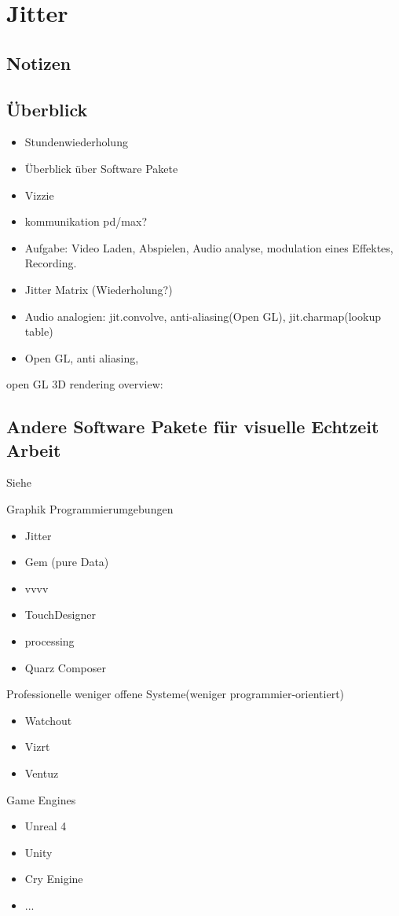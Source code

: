\chapter{Jitter}
\label{Jitter}
\section{Notizen}

\section{Überblick}
\begin{itemize}
	\item Stundenwiederholung
	\item Überblick über Software Pakete
	\item Vizzie
	\item kommunikation pd/max?
	\item Aufgabe: Video Laden, Abspielen, Audio analyse, modulation eines Effektes, Recording.
	\item Jitter Matrix (Wiederholung?)
	\item Audio analogien: jit.convolve, anti-aliasing(Open GL), jit.charmap(lookup table)

	\item Open GL, anti aliasing, 
\end{itemize}
open GL 3D rendering overview: 

\section{Andere Software Pakete für visuelle Echtzeit Arbeit}
Siehe 

Graphik Programmierumgebungen
\begin{itemize}
	\item Jitter
	\item Gem (pure Data)
	\item vvvv
	\item TouchDesigner
	\item processing
	\item Quarz Composer
\end{itemize}
\glqq{}Professionelle\grqq{} weniger offene Systeme(weniger programmier-orientiert)
\begin{itemize}
	\item Watchout
	\item Vizrt
	\item Ventuz
\end{itemize}
Game Engines
\begin{itemize}
	\item Unreal 4
	\item Unity
	\item Cry Enigine
	\item ...
\end{itemize}


